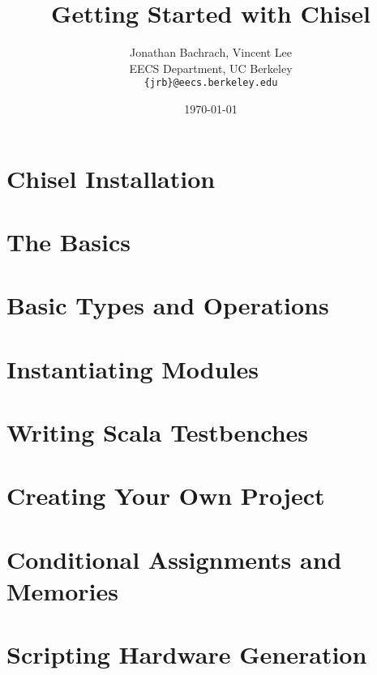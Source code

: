 \documentclass[twocolumn, 10pt]{book}
\title{Getting Started with Chisel}
\author{Jonathan Bachrach, Vincent Lee \\
EECS Department, UC Berkeley\\
{\tt  \{jrb\}@eecs.berkeley.edu}
}
\date{\today}
\begin{document}
\maketitle{}

\chapter{Chisel Installation}


\chapter{The Basics}


\chapter{Basic Types and Operations}


\chapter{Instantiating Modules}


\chapter{Writing Scala Testbenches}


\chapter{Creating Your Own Project}


\chapter{Conditional Assignments and Memories}


\chapter{Scripting Hardware Generation}

\end{document}
